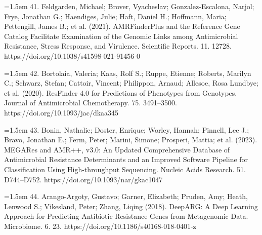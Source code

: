 \documentclass[10.5pt]{article}
\begin{document}
\hangindent=1.5em  41. Feldgarden, Michael; Brover, Vyacheslav; Gonzalez-Escalona, Narjol; Frye, Jonathan G.; Haendiges, Julie; Haft, Daniel H.; Hoffmann, Maria; Pettengill, James B.; et al. (2021). AMRFinderPlus and the Reference Gene Catalog Facilitate Examination of the Genomic Links among Antimicrobial Resistance, Stress Response, and Virulence. Scientific Reports. 11. 12728. https://doi.org/10.1038/s41598-021-91456-0\par

\hangindent=1.5em  42. Bortolaia, Valeria; Kaas, Rolf S.; Ruppe, Etienne; Roberts, Marilyn C.; Schwarz, Stefan; Cattoir, Vincent; Philippon, Arnaud; Allesoe, Rosa Lundbye; et al. (2020). ResFinder 4.0 for Predictions of Phenotypes from Genotypes. Journal of Antimicrobial Chemotherapy. 75. 3491--3500. https://doi.org/10.1093/jac/dkaa345\par

\hangindent=1.5em  43. Bonin, Nathalie; Doster, Enrique; Worley, Hannah; Pinnell, Lee J.; Bravo, Jonathan E.; Ferm, Peter; Marini, Simone; Prosperi, Mattia; et al. (2023). MEGARes and AMR++, v3.0: An Updated Comprehensive Database of Antimicrobial Resistance Determinants and an Improved Software Pipeline for Classification Using High-throughput Sequencing. Nucleic Acids Research. 51. D744--D752. https://doi.org/10.1093/nar/gkac1047\par

\hangindent=1.5em  44. Arango-Argoty, Gustavo; Garner, Elizabeth; Pruden, Amy; Heath, Lenwood S.; Vikesland, Peter; Zhang, Liqing (2018). DeepARG: A Deep Learning Approach for Predicting Antibiotic Resistance Genes from Metagenomic Data. Microbiome. 6. 23. https://doi.org/10.1186/s40168-018-0401-z\par
\end{document}
